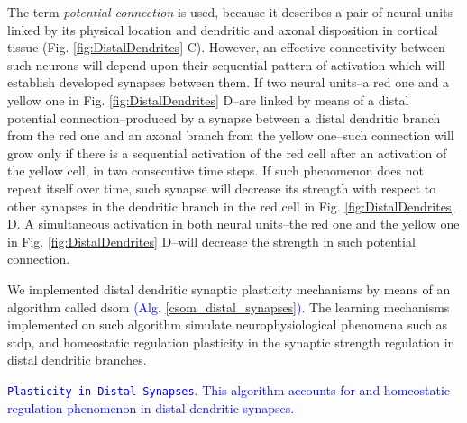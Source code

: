 \documentclass[10pt,letterpaper]{article}
\begin{document}
The term \emph{potential connection} is used, because it describes a pair of neural units linked by its physical location and dendritic and axonal disposition in cortical tissue (Fig. \ref{fig:DistalDendrites} C). However, an effective connectivity between such neurons will depend upon their sequential pattern of activation which will establish developed synapses between them. If two neural units--a red one and a yellow one in Fig. \ref{fig:DistalDendrites} D--are linked by means of a distal potential connection--produced by a synapse between a distal dendritic branch from the red one and an axonal branch from the yellow one--such connection will grow only if there is a sequential activation of the red cell after an activation of the yellow cell, in two consecutive time steps. If such phenomenon does not repeat itself over time, such synapse will decrease its strength with respect to other synapses in the dendritic branch in the red cell in Fig. \ref{fig:DistalDendrites} D. A simultaneous activation in both neural units--the red one and the yellow one in Fig. \ref{fig:DistalDendrites} D--will decrease the strength in such potential connection.

We implemented distal dendritic synaptic plasticity mechanisms by means of an algorithm called \gls{dsom} \textcolor{blue}{(Alg. \ref{csom_distal_synapses})}.
The learning mechanisms implemented on such algorithm simulate neurophysiological phenomena
such as \gls{stdp}, and homeostatic regulation plasticity in the synaptic strength regulation in
distal dendritic branches.

\begin{algorithm}
	\caption{\textcolor{blue}{\texttt{Plasticity in Distal Synapses}. This algorithm accounts for  and homeostatic regulation phenomenon in distal dendritic synapses.}}
\label{csom_distal_synapses}
\begin{algorithmic}[1]
		\ENDFOR
	\ENDFOR
		\ENDFOR
	\ENDFOR
				\ENDIF
			\ENDFOR
		\ENDFOR
	\ENDIF
\end{algorithmic}
\end{algorithm}
\end{document}
